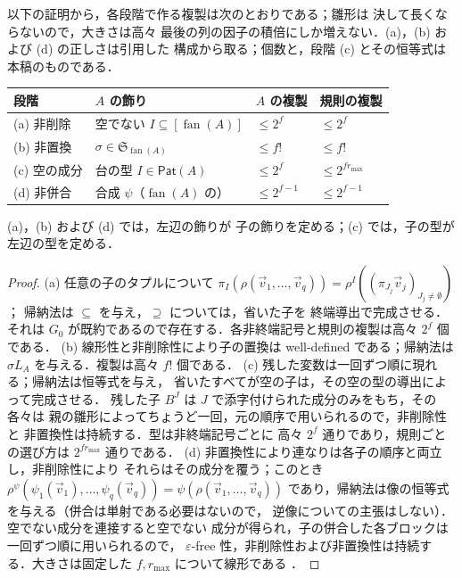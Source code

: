 \documentclass[11pt,a4paper]{ltjsarticle}
\numberwithin{equation}{section}
\theoremstyle{plain}
\theoremstyle{definition}
\theoremstyle{remark}
\newcommand{\tuple}[1]{\vec{#1}}
\newcommand{\eps}{\varepsilon}
\newcommand{\fan}{\operatorname{fan}}
\theoremstyle{plain}
\begin{document}
以下の証明から，各段階で作る複製は次のとおりである；雛形は
決して長くならないので，大きさは高々
最後の列の因子の積倍にしか増えない．(a)，(b) および (d) の正しさは引用した
構成から取る；個数と，段階 (c) とその恒等式は本稿のものである．
\begin{center}
\footnotesize
\setlength{\tabcolsep}{4pt}
\renewcommand{\arraystretch}{1.15}
\begin{tabular}{@{}llll@{}}
\hline
段階 & $A$ の飾り & $A$ の複製 & 規則の複製\\
\hline
(a) 非削除 & 空でない $I\subseteq[\fan(A)]$ & $\le2^f$ & $\le2^f$\\
(b) 非置換 & $\sigma\in\mathfrak S_{\fan(A)}$ & $\le f!$ & $\le f!$\\
(c) 空の成分 & 台の型 $I\in\mathsf{Pat}(A)$ & $\le2^f$ & $\le2^{fr_{\max}}$\\
(d) 非併合 & 合成 $\psi$（$\fan(A)$ の） & $\le2^{f-1}$ & $\le2^{f-1}$\\
\hline
\end{tabular}
\end{center}
(a)，(b) および (d) では，左辺の飾りが
子の飾りを定める；(c) では，子の型が左辺の型を定める．

\begin{proof}
(a) 任意の子のタプルについて
$\pi_I(\rho(\tuple v_1,\ldots,\tuple v_q))=\rho^I((\pi_{J_j}\tuple v_j)_{J_j\ne\emptyset})$；
帰納法は $\subseteq$ を与え，$\supseteq$ については，省いた子を
終端導出で完成させる．それは $G_0$ が既約であるので存在する．各非終端記号と規則の複製は高々 $2^f$
個である．
(b) 線形性と非削除性により子の置換は well-defined である；帰納法は
$\sigma L_A$ を与える．複製は高々 $f!$ 個である．
(c) 残した変数は一回ずつ順に現れる；帰納法は恒等式を与え，
省いたすべてが空の子は，その空の型の導出によって完成させる．
残した子 $B^J$ は $J$ で添字付けられた成分のみをもち，その各々は
親の雛形によってちょうど一回，元の順序で用いられるので，非削除性と
非置換性は持続する．型は非終端記号ごとに
高々 $2^f$ 通りであり，規則ごとの選び方は $2^{fr_{\max}}$ 通りである．
(d) 非置換性により連なりは各子の順序と両立し，非削除性により
それらはその成分を覆う；このとき
$\rho^\psi(\psi_1(\tuple v_1),\ldots,\psi_q(\tuple v_q))=\psi(\rho(\tuple v_1,\ldots,\tuple v_q))$
であり，帰納法は像の恒等式を与える（併合は単射である必要はないので，
逆像についての主張はしない）．空でない成分を連接すると空でない
成分が得られ，子の併合した各ブロックは一回ずつ順に用いられるので，
$\eps$-free 性，非削除性および非置換性は持続する．大きさは固定した $f,r_{\max}$ について線形である
\cite[Section~2.3, after Example~2]{Yoshinaka2011}．
\end{proof}
\end{document}
